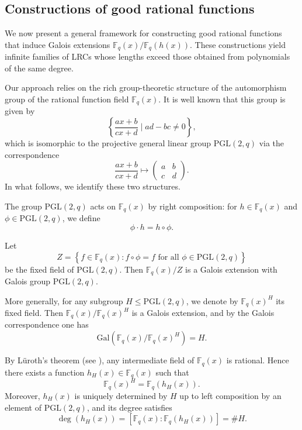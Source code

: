 \documentclass[1p,final]{elsarticle}
\newtheorem{open problem}[theorem]{Open Problem}
\begin{document}
\subsection{Constructions of good rational functions}

We now present a general framework for constructing good rational functions that induce Galois extensions $\mathbb{F}_{q}(x)/\mathbb{F}_{q}(h(x))$. These constructions yield infinite families of LRCs whose lengths exceed those obtained from polynomials of the same degree.

\medskip

Our approach relies on the rich group-theoretic structure of the automorphism group of the rational function field $\mathbb{F}_{q}(x)$. It is well known that this group is given by
\[
\left\{\frac{ax+b}{cx+d}\mid ad-bc\ne 0\right\},
\]
which is isomorphic to the projective general linear group $\mathrm{PGL}(2, q)$ via the correspondence
\[
\frac{ax+b}{cx+d}\mapsto
\begin{pmatrix}
a & b\\
c & d
\end{pmatrix}.
\]
In what follows, we identify these two structures.

\medskip

The group $\mathrm{PGL}(2, q)$ acts on $\mathbb{F}_{q}(x)$ by right composition: for $h\in \mathbb{F}_{q}(x)$ and $\phi\in \mathrm{PGL}(2, q)$, we define
\[
\phi \cdot h = h \circ \phi.
\]

\medskip

Let
\[
Z = \left\{ f \in \mathbb{F}_{q}(x) : f \circ \phi = f \text{ for all } \phi \in\mathrm{PGL}(2, q) \right\}
\]
be the fixed field of $\mathrm{PGL}(2, q)$. Then $\mathbb{F}_{q}(x)/Z$ is a Galois extension with Galois group $\mathrm{PGL}(2, q)$.

\medskip

More generally, for any subgroup $H \le \mathrm{PGL}(2, q)$, we denote by $\mathbb{F}_q(x)^{H}$ its fixed field. Then $\mathbb{F}_q(x)/\mathbb{F}_q(x)^{H}$ is a Galois extension, and by the Galois correspondence one has
\[
\mathrm{Gal}(\mathbb{F}_q(x)/\mathbb{F}_q(x)^{H})=H.
\]

\medskip

By L\"uroth's theorem (see \cite{Stichtenoth2009}), any intermediate field of $\mathbb{F}_q(x)$ is rational. Hence there exists a function $h_H(x)\in \mathbb{F}_q(x)$ such that
\[
\mathbb{F}_q(x)^{H}=\mathbb{F}_q(h_H(x)).
\]
Moreover, $h_H(x)$ is uniquely determined by $H$ up to left composition by an element of $\mathrm{PGL}(2, q)$, and its degree satisfies
\[
\deg (h_H(x))=[ \mathbb{F}_q(x):\mathbb{F}_q(h_H(x))]=\#H.
\]
\end{document}

